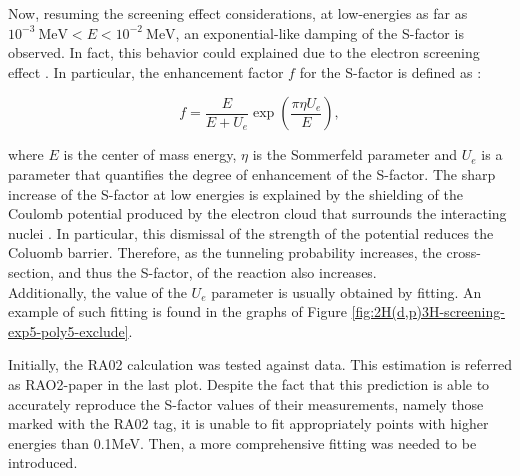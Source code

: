 \documentclass[openany]{book}
\begin{document}


Now, resuming the screening effect considerations, at low-energies as far as $ \mathrm{10^{-3} \ MeV}  <  E<\mathrm{10^{-2} \ MeV}$, an exponential-like damping of the S-factor is observed. In fact, this  behavior could explained due to the electron screening effect \cite{raiola_migliardi_gyurky_aliotta_formicola_bonetti_broggini_campajola_corvisiero_costantini_et_2002}. In particular, the enhancement factor $f$ for the S-factor is defined as \cite{assenbaum_langanke_rolfs_1987}: 

\begin{equation}\label{eq:screening_factor}
	f = \frac{E}{E + U_e}\exp{\left(\frac{\pi \eta U_e}{E}\right)},
\end{equation}

where $E$ is the center of mass energy, $\eta$ is the Sommerfeld parameter and $U_e$ is a parameter that quantifies the degree of enhancement of the S-factor. The sharp increase of the S-factor at low energies is explained by the shielding of the Coulomb potential produced by the electron cloud that surrounds the interacting nuclei \cite{assenbaum_langanke_rolfs_1987}. In particular, this dismissal of the strength of the potential reduces the Coluomb barrier. Therefore, as the tunneling probability increases, the cross-section, and thus the S-factor, of the reaction also increases. \\

Additionally, the value of the $U_e$ parameter is usually obtained by fitting. An example of such fitting is found in the graphs of Figure \ref{fig:2H(d,p)3H-screening-exp5-poly5-exclude}.


Initially, the RA02 calculation \cite{raiola_migliardi_gyurky_aliotta_formicola_bonetti_broggini_campajola_corvisiero_costantini_et_2002} was tested against data. This estimation is referred as RAO2-paper in the last plot. Despite the fact that this prediction is able to accurately reproduce the S-factor values of their measurements, namely those marked with the RA02 tag, it is unable to fit appropriately points with higher energies than 0.1MeV. Then, a more comprehensive fitting was needed to be introduced. 
\end{document}
